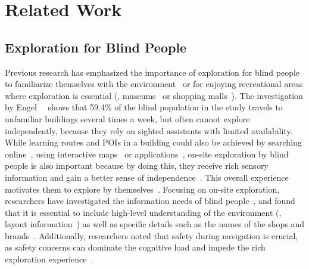 \section{Related Work}
\subsection{Exploration for Blind People}
Previous research has emphasized the importance of exploration for blind people to familiarize themselves with the environment~\cite{jain2023want} or for enjoying recreational areas where exploration is essential (\eg, museums~\cite{kayukawa2023enhancing} or shopping malls~\cite{kamikubo2024we}).
The investigation by Engel~\etal~\cite{Engel2020travelling} shows that 59.4\% of the blind population in the study travels to unfamiliar buildings several times a week, but often cannot explore independently, because they rely on sighted assistants with limited availability.
While learning routes and POIs in a building could also be achieved by searching online~\cite{Engel2020travelling}, using interactive maps~\cite{wang2022bentomuseum,nagassa20233d,sargsyan20233d,poppinga2011touchover} or applications~\cite{india2021vstroll,guerreiro2017virtual}, on-site exploration by blind people is also important because by doing this, they receive rich sensory information and gain a better sense of independence~\cite{kamikubo2024we}.
This overall experience motivates them to explore by themselves~\cite{guerreiro2019airport,kamikubo2024we}. 
Focusing on on-site exploration, researchers have investigated the information needs of blind people~\cite{hoogsteen2022beyond,williams2014just,banovic2013uncovering,jain2023want,kamikubo2024we}, and found that it is essential to include high-level understanding of the environment (\eg, layout information~\cite{jain2023want}) as well as specific details such as the names of the shops and brands~\cite{banovic2013uncovering}.
Additionally, researchers noted that safety during navigation is crucial, as safety concerns can dominate the cognitive load and impede the rich exploration experience~\cite{cai2024navigating,zhang2023follower,jain2023want}. 

